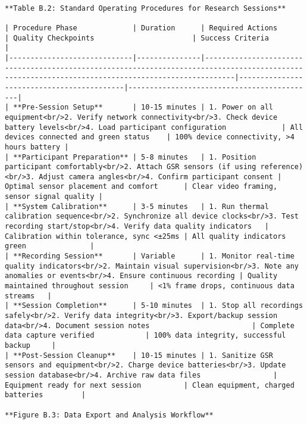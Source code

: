 \documentclass[11pt,a4paper]{report}
\begin{document}
\begin{verbatim}

**Table B.2: Standard Operating Procedures for Research Sessions**

| Procedure Phase             | Duration      | Required Actions                                                                                                                                  | Quality Checkpoints                       | Success Criteria                           |
|-----------------------------|---------------|---------------------------------------------------------------------------------------------------------------------------------------------------|-------------------------------------------|--------------------------------------------|
| **Pre-Session Setup**       | 10-15 minutes | 1. Power on all equipment<br/>2. Verify network connectivity<br/>3. Check device battery levels<br/>4. Load participant configuration             | All devices connected and green status    | 100% device connectivity, >4 hours battery |
| **Participant Preparation** | 5-8 minutes   | 1. Position participant comfortably<br/>2. Attach GSR sensors (if using reference)<br/>3. Adjust camera angles<br/>4. Confirm participant consent | Optimal sensor placement and comfort      | Clear video framing, sensor signal quality |
| **System Calibration**      | 3-5 minutes   | 1. Run thermal calibration sequence<br/>2. Synchronize all device clocks<br/>3. Test recording start/stop<br/>4. Verify data quality indicators   | Calibration within tolerance, sync <±25ms | All quality indicators green               |
| **Recording Session**       | Variable      | 1. Monitor real-time quality indicators<br/>2. Maintain visual supervision<br/>3. Note any anomalies or events<br/>4. Ensure continuous recording | Quality maintained throughout session     | <1% frame drops, continuous data streams   |
| **Session Completion**      | 5-10 minutes  | 1. Stop all recordings safely<br/>2. Verify data integrity<br/>3. Export/backup session data<br/>4. Document session notes                        | Complete data capture verified            | 100% data integrity, successful backup     |
| **Post-Session Cleanup**    | 10-15 minutes | 1. Sanitize GSR sensors and equipment<br/>2. Charge device batteries<br/>3. Update session database<br/>4. Archive raw data files                 | Equipment ready for next session          | Clean equipment, charged batteries         |

**Figure B.3: Data Export and Analysis Workflow**

\end{verbatim}
\end{document}
